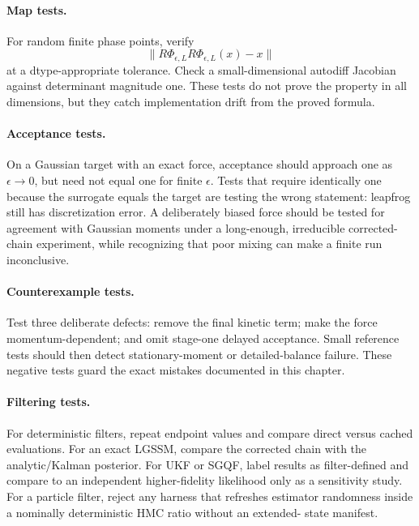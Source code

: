 \paragraph{Map tests.}
For random finite phase points, verify
\begin{equation}
 \|R\Phi_{\epsilon,L}R\Phi_{\epsilon,L}(x)-x\|
 \end{equation}
at a dtype-appropriate tolerance.  Check a small-dimensional autodiff Jacobian
against determinant magnitude one.  These tests do not prove the property in
all dimensions, but they catch implementation drift from the proved formula.

\paragraph{Acceptance tests.}
On a Gaussian target with an exact force, acceptance should approach one as
$\epsilon\to0$, but need not equal one for finite $\epsilon$.  Tests that
require identically one because the surrogate equals the target are testing the
wrong statement: leapfrog still has discretization error.  A deliberately
biased force should be tested for agreement with Gaussian moments under a
long-enough, irreducible corrected-chain experiment, while recognizing that
poor mixing can make a finite run inconclusive.

\paragraph{Counterexample tests.}
Test three deliberate defects: remove the final kinetic term; make the force
momentum-dependent; and omit stage-one delayed acceptance.  Small reference
tests should then detect stationary-moment or detailed-balance failure.  These
negative tests guard the exact mistakes documented in this chapter.

\paragraph{Filtering tests.}
For deterministic filters, repeat endpoint values and compare direct versus
cached evaluations.  For an exact LGSSM, compare the corrected chain with the
analytic/Kalman posterior.  For UKF or SGQF, label results as filter-defined and
compare to an independent higher-fidelity likelihood only as a sensitivity
study.  For a particle filter, reject any harness that refreshes estimator
randomness inside a nominally deterministic HMC ratio without an extended-
state manifest.

